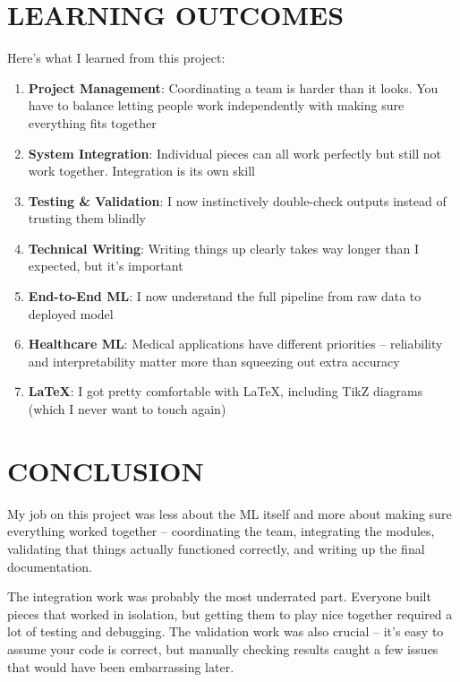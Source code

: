 \documentclass[12pt]{article}
\begin{document}
\section{LEARNING OUTCOMES}

Here's what I learned from this project:

\begin{enumerate}
    \item \textbf{Project Management}: Coordinating a team is harder than it looks. You have to balance letting people work independently with making sure everything fits together
    
    \item \textbf{System Integration}: Individual pieces can all work perfectly but still not work together. Integration is its own skill
    
    \item \textbf{Testing \& Validation}: I now instinctively double-check outputs instead of trusting them blindly
    
    \item \textbf{Technical Writing}: Writing things up clearly takes way longer than I expected, but it's important
    
    \item \textbf{End-to-End ML}: I now understand the full pipeline from raw data to deployed model
    
    \item \textbf{Healthcare ML}: Medical applications have different priorities -- reliability and interpretability matter more than squeezing out extra accuracy
    
    \item \textbf{LaTeX}: I got pretty comfortable with LaTeX, including TikZ diagrams (which I never want to touch again)
\end{enumerate}

\newpage
\section{CONCLUSION}

My job on this project was less about the ML itself and more about making sure everything worked together -- coordinating the team, integrating the modules, validating that things actually functioned correctly, and writing up the final documentation.

The integration work was probably the most underrated part. Everyone built pieces that worked in isolation, but getting them to play nice together required a lot of testing and debugging. The validation work was also crucial -- it's easy to assume your code is correct, but manually checking results caught a few issues that would have been embarrassing later.
\end{document}
